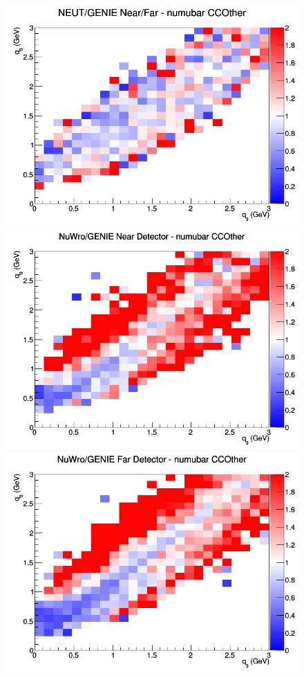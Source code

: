 \documentclass[12pt]{article}
\begin{document}
\begin{figure}[h]
\endminipage
{}
\includegraphics[width=\linewidth]{eff_q0_q3/FGT/ratios/CCOther_NEUT_GENIE_numubar_NF_q3_q0.png}
\endminipage
\newline
{}
\includegraphics[width=\linewidth]{eff_q0_q3/FGT/ratios/CCOther_NuWro_GENIE_numubar_near_q3_q0.png}
\endminipage
{}
\includegraphics[width=\linewidth]{eff_q0_q3/FGT/ratios/CCOther_NuWro_GENIE_numubar_far_q3_q0.png}

\end{figure}
\end{document}
